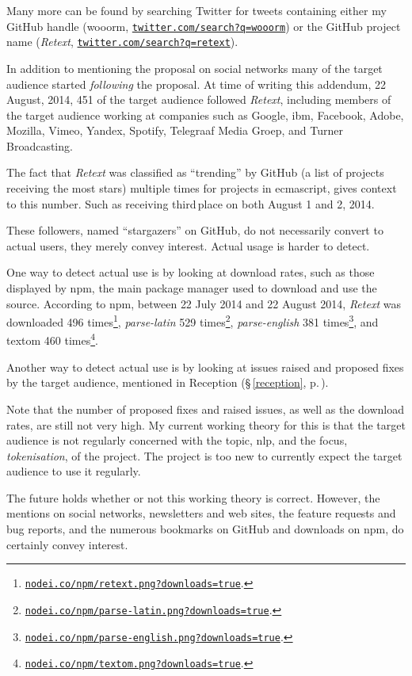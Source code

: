 \noindent Many more can be found by searching Twitter for tweets containing
  either my GitHub handle (wooorm,
  \href{https://twitter.com/search?f=realtime&q=wooorm}{\nolinkurl{twitter.com/search?q=wooorm}})
  or the GitHub project name (\emph{Retext},
  \href{https://twitter.com/search?f=realtime&q=retext}{\nolinkurl{twitter.com/search?q=retext}}).

In addition to mentioning the proposal on social networks many of the target
  audience started \emph{following} the proposal.
At time of writing this addendum, 22 August, 2014, 451 of the target
  audience followed \emph{Retext}, including members of the target audience
  working at companies such as Google, \gls{ibm}, Facebook, Adobe, Mozilla,
  Vimeo, Yandex, Spotify, Telegraaf Media Groep, and Turner Broadcasting.

The fact that \emph{Retext} was classified as ``trending'' by GitHub (a list
  of projects receiving the most stars) multiple times for projects in
  \gls{ecmascript}, gives context to this number.
Such as receiving third\,place on both August 1 and 2, 2014.

These followers, named ``stargazers'' on GitHub, do not necessarily convert
  to actual users, they merely convey interest.
Actual usage is harder to detect.

One way to detect actual use is by looking at download rates, such as
  those displayed by \gls{npm}, the main package manager used to download
  and use the source.
According to \gls{npm}, between 22 July 2014 and 22 August 2014, \emph{Retext}
  was downloaded 496 times\footnote{
    \href{https://nodei.co/npm/retext.png?downloads=true}{\nolinkurl{nodei.co/npm/retext.png?downloads=true}}.
  }, \emph{parse-latin} 529 times\footnote{
    \href{https://nodei.co/npm/parse-latin.png?downloads=true}{\nolinkurl{nodei.co/npm/parse-latin.png?downloads=true}}.
  }, \emph{parse-english} 381 times\footnote{
    \href{https://nodei.co/npm/parse-english.png?downloads=true}{\nolinkurl{nodei.co/npm/parse-english.png?downloads=true}}.
  },
  and \gls{textom} 460 times\footnote{
    \href{https://nodei.co/npm/textom.png?downloads=true}{\nolinkurl{nodei.co/npm/textom.png?downloads=true}}.
  }.

Another way to detect actual use is by looking at issues raised and proposed
  fixes by the target audience, mentioned in Reception (§\,\ref{reception},
  p.\,\pageref{reception}).

Note that the number of proposed fixes and raised issues, as well as the
  download rates, are still not very high.
My current working theory for this is that the target audience is not
  regularly concerned with the topic, \gls{nlp}, and the focus,
  \emph{tokenisation}, of the project.
The project is too new to currently expect the target audience to use it
  regularly.

The future holds whether or not this working theory is correct.
However, the mentions on social networks, newsletters and web sites,
  the feature requests and bug reports, and the numerous bookmarks on
  GitHub and downloads on \gls{npm}, do certainly convey interest.

\endgroup
